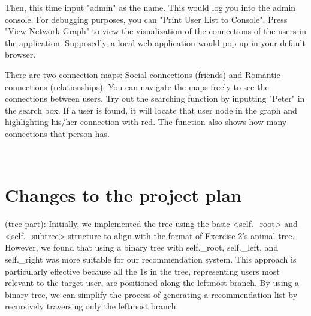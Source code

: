 \documentclass[fontsize=11pt]{article}
\begin{document}
Then, this time input "admin" as the name. This would log you into the admin console. For debugging purposes, you can "Print User List to Console". Press "View Network Graph" to view the visualization of the connections of the users in the application. Supposedly, a local web application would pop up in your default browser.

There are two connection maps: Social connections (friends) and Romantic connections (relationships). You can navigate the maps freely to see the connections between users. Try out the searching function by inputting "Peter" in the search box. If a user is found, it will locate that user node in the graph and highlighting his/her connection with red. The function also shows how many connections that person has.


\\
\section{Changes to the project plan}
(tree part): Initially, we implemented the tree using the basic <self.\_root> and <self.\_subtree> structure to align with the format of Exercise 2's animal tree. However, we found that using a binary tree with self.\_root, self.\_left, and self.\_right was more suitable for our recommendation system. This approach is particularly effective because all the 1s in the tree, representing users most relevant to the target user, are positioned along the leftmost branch. By using a binary tree, we can simplify the process of generating a recommendation list by recursively traversing only the leftmost branch.


\\
\end{document}
